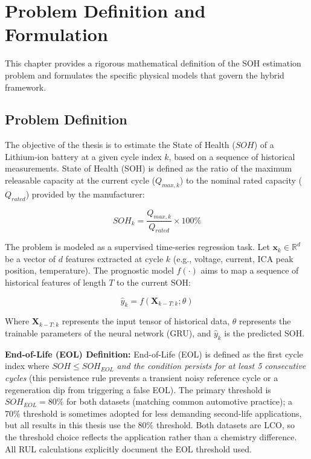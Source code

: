 \chapter{Problem Definition and Formulation}
\label{ch:problem}

This chapter provides a rigorous mathematical definition of the SOH estimation problem and formulates the specific physical models that govern the hybrid framework.

\section{Problem Definition}

The objective of the thesis is to estimate the State of Health ($SOH$) of a Lithium-ion battery at a given cycle index $k$, based on a sequence of historical measurements. State of Health (SOH) is defined as the ratio of the maximum releasable capacity at the current cycle ($Q_{max, k}$) to the nominal rated capacity ($Q_{rated}$) provided by the manufacturer:

\begin{equation}
    SOH_k = \frac{Q_{max, k}}{Q_{rated}} \times 100\%
\end{equation}

The problem is modeled as a supervised time-series regression task. Let $\mathbf{x}_k \in \mathbb{R}^d$ be a vector of $d$ features extracted at cycle $k$ (e.g., voltage, current, ICA peak position, temperature). The prognostic model $f(\cdot)$ aims to map a sequence of historical features of length $T$ to the current SOH:

\begin{equation}
    \hat{y}_k = f(\mathbf{X}_{k-T:k}; \theta)
\end{equation}

Where $\mathbf{X}_{k-T:k}$ represents the input tensor of historical data, $\theta$ represents the trainable parameters of the neural network (GRU), and $\hat{y}_k$ is the predicted SOH.

\textbf{End-of-Life (EOL) Definition:} End-of-Life (EOL) is defined as the first cycle index where $SOH \leq SOH_{EOL}$ \emph{and the condition persists for at least 5 consecutive cycles} (this persistence rule prevents a transient noisy reference cycle or a regeneration dip from triggering a false EOL). The primary threshold is $SOH_{EOL} = 80\%$ for both datasets (matching common automotive practice); a $70\%$ threshold is sometimes adopted for less demanding second-life applications, but all results in this thesis use the $80\%$ threshold. Both datasets are LCO, so the threshold choice reflects the application rather than a chemistry difference. All RUL calculations explicitly document the EOL threshold used.


